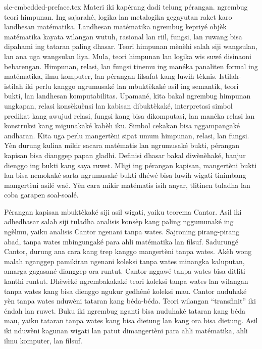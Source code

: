 \begin{filecontents*}[overwrite]{slc-embedded-preface.tex}
Materi iki kapérang dadi telung pérangan. 
ngrembug teori himpunan. Ing sajarahé, logika lan metalogika gegayutan
raket karo landhesan matématika. Landhesan matématika ngrembug kepriyé
objèk matématika kayata wilangan wutuh, rasional lan riil, fungsi, lan
ruwang bisa dipahami ing tataran paling dhasar. Teori himpunan mènèhi
salah siji wangsulan, lan ana uga wangsulan liya. Mula, teori
himpunan lan logika wis suwé disinaoni bebarengan. Himpunan, relasi,
lan fungsi tinemu ing manéka panaliten formal ing matématika, ilmu
komputer, lan pérangan filsafat kang luwih tèknis. Istilah-istilah iki
perlu kanggo ngrumusaké lan mbuktèkaké asil ing semantik, teori bukti,
lan landhesan komputabilitas. Upamané, kita bakal ngrembug himpunan
ungkapan, relasi konsèkuènsi lan kabisan dibuktèkaké, interpretasi
simbol predikat kang awujud relasi, fungsi kang bisa dikomputasi, lan
manéka relasi lan konstruksi kang migunakaké kabèh iku. Simbol
cekakan bisa nggampangaké andharan. Kita uga perlu mangertèni sipat
umum himpunan, relasi, lan fungsi. Yèn durung kulina mikir sacara
matématis lan ngrumusaké bukti, pérangan kapisan bisa dianggep
papan gladhi. Definisi dhasar bakal diwènèhaké, banjur dienggo ing
bukti kang saya ruwet. Mligi ing pérangan kapisan, mangertèni bukti
lan bisa nemokaké sarta ngrumusaké bukti dhéwé bisa luwih wigati
tinimbang mangertèni asilé waé. Yèn cara mikir matématis isih anyar,
tlitinen tuladha lan coba garapen soal-soalé.

Pérangan kapisan mbuktèkaké siji asil wigati, yaiku teorema Cantor.
Asil iki adhedhasar salah siji tuladha analisis konsèp kang paling
nggumunaké ing ngèlmu, yaiku analisis Cantor ngenani tanpa wates.
Sajroning pirang-pirang abad, tanpa wates mbingungaké para ahli
matématika lan filsuf. Sadurungé Cantor, durung ana cara kang trep
kanggo mangertèni tanpa wates. Akèh wong malah nganggep pamikiran
ngenani koleksi tanpa wates minangka kaluputan, amarga gagasané
dianggep ora runtut. Cantor nggawé tanpa wates bisa ditliti kanthi
runtut. Dhèwèké ngrembakakaké teori koleksi tanpa wates lan wilangan
tanpa wates kang bisa dienggo ngukur gedhéné koleksi mau. Cantor
nuduhaké yèn tanpa wates nduwèni tataran kang béda-béda. Teori
wilangan “transfinit” iki éndah lan ruwet. Buku iki ngrembug nganti
bisa nuduhaké tataran kang béda mau, yaiku tataran tanpa wates kang
bisa dietung lan kang ora bisa dietung. Asil iki nduwèni kagunan
wigati lan patut dimangertèni para ahli matématika, ahli ilmu
komputer, lan filsuf.


\end{filecontents*}
